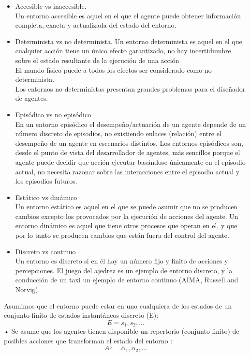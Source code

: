 \begin{itemize}
   \item Accesible vs inaccesible.\\
   Un entorno accesible es aquel en el que el agente puede
   obtener información completa, exacta y actualizada del
   estado del entorno.
   \item Determinista vs no determinista.
   Un entorno determinista es aquel en el que cualquier
   acción tiene un único efecto garantizado, no hay
   incertidumbre sobre el estado resultante de la ejecución de
   una acción\\
   El mundo físico puede a todos los efectos ser
   considerado como no determinista.\\
   Los entornos no deterministas presentan grandes
   problemas para el diseñador de agentes.
   \item Episódico vs no episódico\\
   En un entorno episódico el desempeño/actuación de un
   agente depende de un número discreto de episodios, no
   existiendo enlaces (relación) entre el desempeño de un agente
   en escenarios distintos.
   Los entornos episódicos son, desde el punto de vista del
   desarrollador de agentes, más sencillos porque el agente puede
   decidir que acción ejecutar basándose únicamente en el
   episodio actual, no necesita razonar sobre las interacciones
   entre el episodio actual y los episodios futuros.
   \item Estático vs dinámico\\
   Un entorno estático es aquel en el que se puede asumir que
   no se producen cambios excepto los provocados por la
   ejecución de acciones del agente.
   Un entorno dinámico es aquel que tiene otros procesos que
   operan en el, y que por lo tanto se producen cambios que están
   fuera del control del agente.
   \item Discreto vs continuo\\
   Un entorno es discreto si en él hay un número fijo y finito de
   acciones y percepciones.
   El juego del ajedrez es un ejemplo de entorno discreto, y la
   conducción de un taxi un ejemplo de entorno continuo (AIMA,
   Russell and Norvig).
\end{itemize}

Asumimos que el entorno puede estar en uno cualquiera de los
estados de un conjunto finito de estados instantáneos discreto
(E):
\begin{equation}
   E = { s_1,s_2,...}
\end{equation}
• Se asume que los agentes tienen disponible un repertorio
(conjunto finito) de posibles acciones que transforman el
estado del entorno :
\begin{equation}
   Ac = { \alpha_1,\alpha_2,...}
\end{equation}

